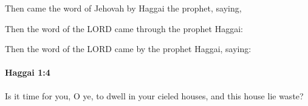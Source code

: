 			\begin{versebox}
					\item[BHS] 
					\item[LXX] 
					\item[ASV] Then came the word of Jehovah by Haggai the prophet, saying,
					\item[NIV] Then the word of the LORD came through the prophet Haggai:
					\item[NRSV] Then the word of the LORD came by the prophet Haggai, saying:
			\end{versebox}

		\paragraph{Haggai 1:4} %
			\label{HAGGAI-1-4}

			Is it time for you, O ye, to dwell in your cieled houses, and this house lie waste?

